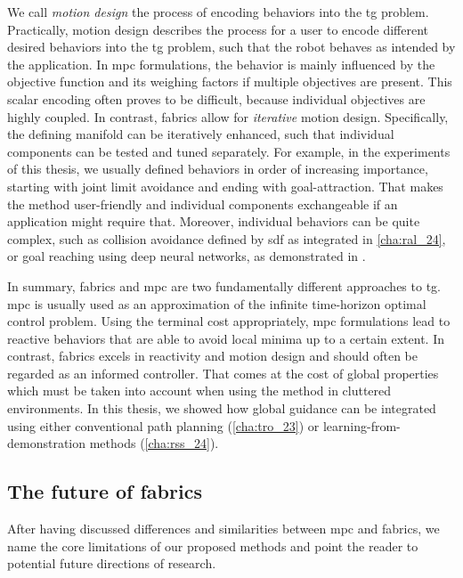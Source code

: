 We call \textit{motion design} the process of encoding
behaviors into the \ac{tg} problem. Practically, motion
design describes the 
process for a user to encode different desired behaviors
into the \ac{tg} problem, such that the robot behaves as
intended by the application. In \ac{mpc} formulations,
the behavior is mainly influenced by the objective function
and its weighing factors if multiple objectives are present.
This scalar encoding often proves to be difficult, because
individual objectives are highly coupled. In contrast,
\ac{fabrics} allow for \textit{iterative} motion design.
Specifically, the defining manifold can be iteratively
enhanced, such that individual components can be tested and
tuned separately. For example, in the experiments of this
thesis, we usually defined behaviors in order of
increasing importance, starting with joint limit avoidance
and ending with goal-attraction. That makes the method
user-friendly and individual components exchangeable if an
application might require that. Moreover, individual
behaviors can be quite complex, such as collision avoidance
defined by \ac{sdf} as integrated in \cref{cha:ral_24},
or goal reaching using
deep neural networks, as demonstrated in \cite{xie2023neural}.

In summary, \ac{fabrics} and \ac{mpc} are two fundamentally
different approaches to \ac{tg}. \Ac{mpc} is usually used as
an approximation of the infinite time-horizon optimal
control problem. Using the terminal cost appropriately,
\ac{mpc} formulations lead to reactive behaviors that are
able to avoid local minima up to a certain extent. In
contrast, \ac{fabrics} excels in reactivity and motion
design and should often be regarded as an informed
controller. That comes at the cost of global properties
which must be taken into account when using the method in
cluttered environments. In this thesis, we showed how global
guidance can be integrated using either conventional
path planning (\cref{cha:tro_23}) or learning-from-demonstration methods
(\cref{cha:rss_24}).

\subsection{The future of \ac{fabrics}}
\label{sec:discussion_limitations_of_fabrics}

After having discussed differences and similarities between
\ac{mpc} and \ac{fabrics}, we name the core limitations of
our proposed methods and point the reader to potential
future directions of research. 
